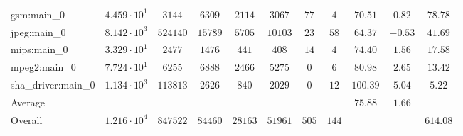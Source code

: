 \begin{tabular}{|l|c|c|c|c|c|c|c|c|c|c|}
gsm:main\_0             & $ 4.459 \cdot 10^{1} $ & $ 3144   $ & $ 6309  $ & $ 2114  $ & $ 3067  $ & $ 77  $ & $ 4   $ & $ 70.51       $ & $ 0.82    $ & $ 78.78   $ \\
jpeg:main\_0            & $ 8.142 \cdot 10^{3} $ & $ 524140 $ & $ 15789 $ & $ 5705  $ & $ 10103 $ & $ 23  $ & $ 58  $ & $ 64.37       $ & $ -0.53   $ & $ 41.69   $ \\
mips:main\_0            & $ 3.329 \cdot 10^{1} $ & $ 2477   $ & $ 1476  $ & $ 441   $ & $ 408   $ & $ 14  $ & $ 4   $ & $ 74.40       $ & $ 1.56    $ & $ 17.58   $ \\
mpeg2:main\_0           & $ 7.724 \cdot 10^{1} $ & $ 6255   $ & $ 6888  $ & $ 2466  $ & $ 5275  $ & $ 0   $ & $ 6   $ & $ 80.98       $ & $ 2.65    $ & $ 13.42   $ \\
sha\_driver:main\_0     & $ 1.134 \cdot 10^{3} $ & $ 113813 $ & $ 2626  $ & $ 840   $ & $ 2029  $ & $ 0   $ & $ 12  $ & $ 100.39      $ & $ 5.04    $ & $ 5.22    $ \\
\hline
Average                 & $                    $ & $        $ & $       $ & $       $ & $       $ & $     $ & $     $ & $ 75.88       $ & $ 1.66    $ & $         $ \\
\hline
Overall                 & $ 1.216 \cdot 10^{4} $ & $ 847522 $ & $ 84460 $ & $ 28163 $ & $ 51961 $ & $ 505 $ & $ 144 $ & $             $ & $         $ & $ 614.08  $ \\
\hline
\end{tabular}
